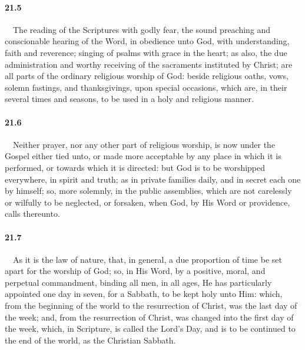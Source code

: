 \paragraph{21.5}\ \ The reading of the Scriptures with godly fear, the sound preaching and conscionable hearing of the Word, in obedience unto God, with understanding, faith and reverence; singing of psalms with grace in the heart; as also, the due administration and worthy receiving of the sacraments instituted by Christ; are all parts of the ordinary religious worship of God: beside religious oaths, vows, solemn fastings, and thanksgivings, upon special occasions, which are, in their several times and seasons, to be used in a holy and religious manner.   
\bigskip
\paragraph{21.6}\ \ Neither prayer, nor any other part of religious worship, is now under the Gospel either tied unto, or made more acceptable by any place in which it is performed, or towards which it is directed: but God is to be worshipped everywhere, in spirit and truth; as in private families daily, and in secret each one by himself; so, more solemnly, in the public assemblies, which are not carelessly or wilfully to be neglected, or forsaken, when God, by His Word or providence, calls thereunto.   
\bigskip
\paragraph{21.7}\ \ As it is the law of nature, that, in general, a due proportion of time be set apart for the worship of God; so, in His Word, by a positive, moral, and perpetual commandment, binding all men, in all ages, He has particularly appointed one day in seven, for a Sabbath, to be kept holy unto Him: which, from the beginning of the world to the resurrection of Christ, was the last day of the week; and, from the resurrection of Christ, was changed into the first day of the week, which, in Scripture, is called the Lord's Day, and is to be continued to the end of the world, as the Christian Sabbath.   
\bigskip
